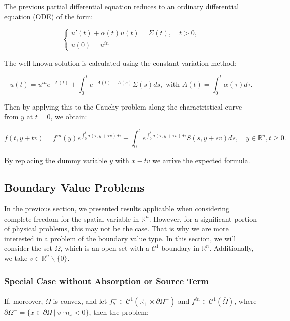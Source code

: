 \documentclass[onecolumn, 12pt, a4paper]{article}
\begin{document}
The previous partial differential equation reduces to an ordinary differential equation (ODE) of the form:



\[
\begin{cases}
u'(t)+\alpha(t)u(t)=\Sigma(t), \quad t>0,\\
u(0)=u^{in}
\end{cases}
\]

The well-known solution is calculated using the constant variation method:

\[ u(t) = u^{in} e^{-A(t)} + \int_{0}^{t} e^{-A(t)-A(s)}\Sigma(s)ds, \text{ with } A(t)=\int_{0}^{t} \alpha (\tau) d\tau. \]

Then by applying this to the Cauchy problem along the charactristical curve from $y$ at $t=0$, we obtain:

\[ f(t,y+tv) = f^{in}(y) e^{\int_{0}^{t}a(\tau,y+\tau v)d\tau} + \int_{0}^{t} e^{\int_{0}^{t}a(\tau,y+\tau v)d\tau}S(s,y+sv)ds, \quad y\in \mathbb{R}^n, t \geq 0.\]

By replacing the dummy variable $y$ with $x-tv$ we arrive the expected formula.


\subsection{Boundary Value Problems}

In the previous section, we presented results applicable when considering complete freedom for the spatial variable in $\mathbb{R}^n$. However, for a significant portion of physical problems, this may not be the case. That is why we are more interested in a problem of the boundary value type. In this section, we will consider the set $\Omega$, which is an open set with a $\mathcal{C}^1$ boundary in $\mathbb{R}^n$. Additionally, we take $v \in \mathbb{R}^n\backslash \{0\}$.

\subsubsection{Special Case without Absorption or Source Term}

\paragraph{}
If, moreover, $\Omega$ is convex, and let $f_b^- \in \mathcal{C}^1(\mathbb{R}_+ \times \partial \Omega^-)$ and $f^{in} \in \mathcal{C}^1(\overline{\Omega})$, where $\partial \Omega^- = \{x\in\partial \Omega~ | ~ v\cdot n_x<0\}$, then the problem:
\end{document}
